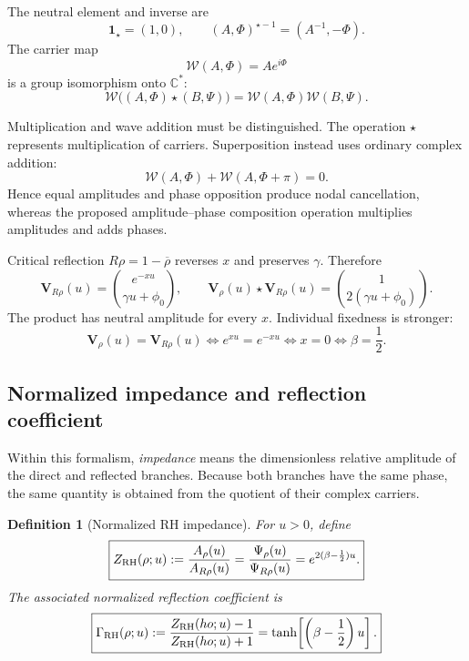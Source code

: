 \documentclass[11pt]{article}
\newtheorem{definition}{Definition}[section]
\begin{document}
The neutral element and inverse are
\begin{equation}\label{eq:star-neutral-inverse}
 \mathbf 1_\star=(1,0),\qquad
 (A,\Phi)^{\star-1}=(A^{-1},-\Phi).
\end{equation}
The carrier map
\begin{equation}\label{eq:carrier-map}
 \mathcal W(A,\Phi)=Ae^{i\Phi}
\end{equation}
is a group isomorphism onto $\mathbb C^*$:
\begin{equation}\label{eq:carrier-homomorphism}
 \mathcal W\bigl((A,\Phi)\star(B,\Psi)\bigr)
 =\mathcal W(A,\Phi)\mathcal W(B,\Psi).
\end{equation}

Multiplication and wave addition must be distinguished.  The operation $\star$ represents
multiplication of carriers.  Superposition instead uses ordinary complex addition:
\begin{equation}\label{eq:superposition-cancellation}
 \mathcal W(A,\Phi)+\mathcal W(A,\Phi+\pi)=0.
\end{equation}
Hence equal amplitudes and phase opposition produce nodal cancellation, whereas the
proposed amplitude--phase composition operation multiplies amplitudes and adds phases.

Critical reflection $R\rho=1-\overline\rho$ reverses $x$ and preserves $\gamma$.  Therefore
\begin{equation}\label{eq:reflected-state}
 \mathbf V_{R\rho}(u)=\binom{e^{-xu}}{\gamma u+\phi_0},
 \qquad
 \mathbf V_\rho(u)\star\mathbf V_{R\rho}(u)
 =\binom{1}{2(\gamma u+\phi_0)}.
\end{equation}
The product has neutral amplitude for every $x$.  Individual fixedness is stronger:
\begin{equation}\label{eq:state-fixedness}
 \mathbf V_\rho(u)=\mathbf V_{R\rho}(u)
 \iff e^{xu}=e^{-xu}
 \iff x=0
 \iff \beta=\frac12.
\end{equation}

\subsection{Normalized impedance and reflection coefficient}
Within this formalism, \emph{impedance} means the dimensionless relative amplitude of the
direct and reflected branches.  Because both branches have the same phase, the same quantity
is obtained from the quotient of their complex carriers.

\begin{definition}[Normalized RH impedance]\label{def:RH-impedance}
For $u>0$, define
\begin{equation}\label{eq:RH-impedance}
 \boxed{
 Z_{\rm RH}(\rho;u)
 :=\frac{A_\rho(u)}{A_{R\rho}(u)}
 =\frac{\Psi_\rho(u)}{\Psi_{R\rho}(u)}
 =e^{2(\beta-\frac12)u}.}
\end{equation}
The associated normalized reflection coefficient is
\begin{equation}\label{eq:RH-reflection-coefficient}
 \boxed{
 \Gamma_{\rm RH}(\rho;u)
 :=\frac{Z_{\rm RH}(
ho;u)-1}{Z_{\rm RH}(
ho;u)+1}
 =\tanh\!\left[\left(\beta-\frac12\right)u\right].}
\end{equation}
\end{definition}
\end{document}
